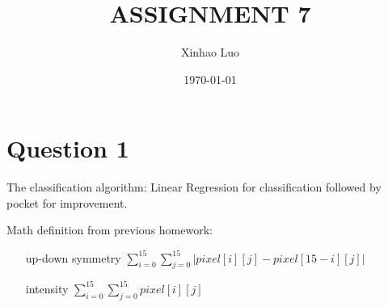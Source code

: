\documentclass{article}
\title{\bf \Large ASSIGNMENT 7}
\author{Xinhao Luo}
\date{\today}
\def\math#1{$#1$}
\begin{document}
\maketitle
\medskip

\section{Question 1}

The classification algorithm: Linear Regression for classification followed by pocket for improvement.

Math definition from previous homework:
\begin{itemize}
    \item [up-down symmetry] \math{\sum_{i = 0}^{15}\sum_{j = 0}^{15}|pixel[i][j] - pixel[15 - i][j]|} 
    \item [intensity] \math{\sum_{i = 0}^{15}\sum_{j = 0}^{15}pixel[i][j]}
\end{itemize}
\end{document}
